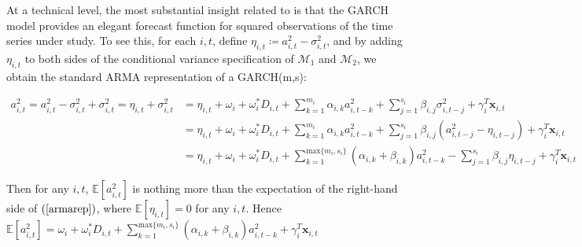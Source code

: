 \documentclass[11pt]{article}
\newcommand{\x}{\textbf{x}}
\def\mc#1{\mathcal{#1}} %
\def\E{\mathbb{E}} %
\def\mc#1{\mathcal{#1}}
\theoremstyle{definition}
\begin{document}
At a technical level, the most substantial insight related to \citet{lin2021minimizing} is that the GARCH model provides an elegant forecast function for squared observations of the time series under study. To see this, for each $i,t$, define $\eta_{i,t} \coloneqq a^{2}_{i,t} - \sigma^{2}_{i,t}$, and by adding $\eta_{i,t}$ to both sides of the conditional variance specification of $\mc{M}_1$ and $\mc{M}_2$, we obtain the standard ARMA representation of a GARCH(m,s):

\begin{align}
a^{2}_{i,t} = a^{2}_{i,t} - \sigma^{2}_{i,t} + \sigma^{2}_{i,t} = \eta_{i,t} + \sigma^{2}_{i,t} &= \eta_{i,t} + \omega_{i} + \omega^{*}_i D_{i,t}  + \sum^{m_{i}}_{k=1}\alpha_{i,k}a^{2}_{i,t-k} + \sum_{j=1}^{s_{i}}\beta_{i,j}\sigma_{i,t-j}^{2} + \gamma_{i}^{T} \x_{i,t} \\
    &= \eta_{i,t} + \omega_{i} + \omega^{*}_i D_{i,t}  + \sum^{m_{i}}_{k=1}\alpha_{i,k}a^{2}_{i,t-k}  + \sum_{j=1}^{s_{i}}\beta_{i,j}(a^{2}_{i,t-j} - \eta_{i,t-j}) + \gamma_{i}^{T} \x_{i,t} \\
    &= \eta_{i,t} + \omega_{i} + \omega^{*}_i D_{i,t}  + \sum^{\text{max}\{m_{i},s_{i}\}}_{k=1}(\alpha_{i,k} + \beta_{i,k})a^{2}_{i,t-k} - \sum_{j=1}^{s_{i}}\beta_{i,j}\eta_{i,t-j} + \gamma_{i}^{T} \x_{i,t}\label{armarep}
\end{align}

Then for any $i,t$, $\E[a^{2}_{i,t}]$ is nothing more than the expectation of the right-hand side of $(\ref{armarep})$, where $\E[\eta_{i,t}] = 0$ for any $i,t$.  Hence $\E[a^{2}_{i,t}] =  \omega_{i} + \omega^{*}_i D_{i,t}  + \sum^{\text{max}\{m_{i},s_{i}\}}_{k=1}(\alpha_{i,k} + \beta_{i,k})a^{2}_{i,t-k} + \gamma_{i}^{T} \x_{i,t}$
\end{document}
